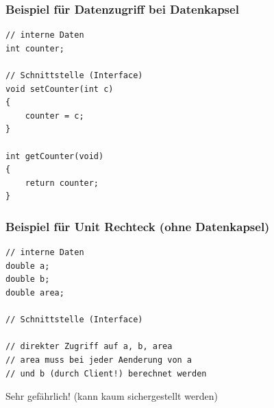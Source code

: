 \begin{multicols}{2}
\subsubsection{Beispiel für Datenzugriff bei Datenkapsel}
\vspace{-\baselineskip}
\begin{minipage}{\linewidth}
\begin{lstlisting}
// interne Daten
int counter;
	
// Schnittstelle (Interface)
void setCounter(int c)
{
	counter = c;
}

int getCounter(void)
{
	return counter;
}
\end{lstlisting}
\end{minipage}
\vfill\null
\columnbreak
\subsubsection{Beispiel für Unit Rechteck (ohne Datenkapsel)}
\vspace{-\baselineskip}
\begin{minipage}{\linewidth}
\begin{lstlisting}
// interne Daten
double a;
double b;
double area;

// Schnittstelle (Interface)

// direkter Zugriff auf a, b, area
// area muss bei jeder Aenderung von a
// und b (durch Client!) berechnet werden
\end{lstlisting}
\end{minipage}
\begin{achtung}
	Sehr gefährlich! (kann kaum sichergestellt werden)
\end{achtung}
\end{multicols}

